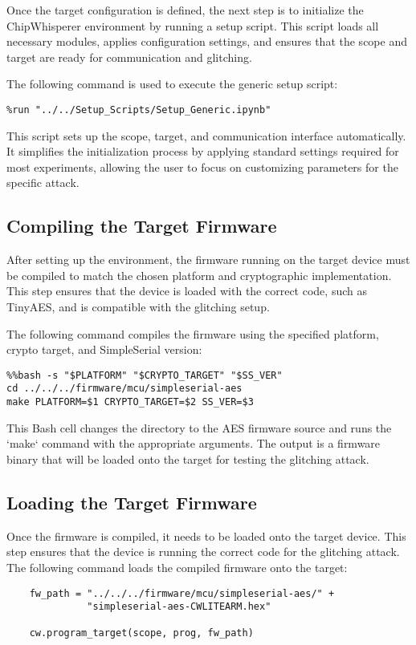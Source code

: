 Once the target configuration is defined, the next step is to initialize the ChipWhisperer environment by running a setup script. This script loads all necessary modules, applies configuration settings, and ensures that the scope and target are ready for communication and glitching.

The following command is used to execute the generic setup script:

\begin{verbatim}
%run "../../Setup_Scripts/Setup_Generic.ipynb"
\end{verbatim}

This script sets up the scope, target, and communication interface automatically. It simplifies the initialization process by applying standard settings required for most experiments, allowing the user to focus on customizing parameters for the specific attack.
\subsection{Compiling the Target Firmware}

After setting up the environment, the firmware running on the target device must be compiled to match the chosen platform and cryptographic implementation. This step ensures that the device is loaded with the correct code, such as TinyAES, and is compatible with the glitching setup.

The following command compiles the firmware using the specified platform, crypto target, and SimpleSerial version:

\begin{verbatim}
%%bash -s "$PLATFORM" "$CRYPTO_TARGET" "$SS_VER"
cd ../../../firmware/mcu/simpleserial-aes
make PLATFORM=$1 CRYPTO_TARGET=$2 SS_VER=$3
\end{verbatim}

This Bash cell changes the directory to the AES firmware source and runs the `make` command with the appropriate arguments. The output is a firmware binary that will be loaded onto the target for testing the glitching attack.
\subsection{Loading the Target Firmware}
Once the firmware is compiled, it needs to be loaded onto the target device. This step ensures that the device is running the correct code for the glitching attack.
The following command loads the compiled firmware onto the target:
\begin{verbatim}
    fw_path = "../../../firmware/mcu/simpleserial-aes/" + 
              "simpleserial-aes-CWLITEARM.hex"
    
    cw.program_target(scope, prog, fw_path)
    \end{verbatim}
